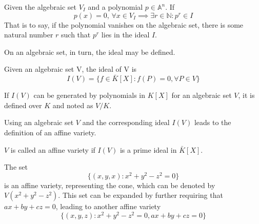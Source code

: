 \begin{defn}[Nullstellensatz]
	Given the algebraic set $V_I$ and a polynomial $p\in\mathbb{A}^n$. If
	\begin{equation*}
	p(x)=0\text{, }\forall x\in V_I \implies \exists r\in\mathbb{N}:p^r\in I
	\end{equation*}
	That is to say, if the polynomial vanishes on the algebraic set, there is some natural number $r$ such that $p^r$ lies in the ideal $I$.
\end{defn}

On an algebraic set, in turn, the ideal may be defined.
\begin{defn}
	Given an algebraic set V, the ideal of V is
	\begin{equation*}
	I(V)=\{f\in\bar{K}[X]:f(P)=0,\forall P\in V\}
	\end{equation*}	
\end{defn}
If $I(V)$ can be generated by polynomials in $K[X]$ for an algebraic set $V$, it is defined over $K$ and noted as $V/K$.

Using an algebraic set $V$ and the corresponding ideal $I(V)$ leads to the definition of an affine variety.
\begin{defn}
	$V$ is called an affine variety if $I(V)$ is a prime ideal in $\bar{K}[X]$.
\end{defn}

\begin{exmp}
	The set
	\begin{equation*}
	\{(x,y,x):x^2+y^2-z^2=0\}
	\end{equation*} is an affine variety, representing the cone, which can be denoted by $V(x^2+y^2-z^2)$. This set can be expanded by further requiring that $ax+by+cz=0$, leading to another affine variety
	\begin{equation*}
	\{(x,y,z):x^2+y^2-z^2=0,ax+by+cz=0\}
	\end{equation*}
\end{exmp}

